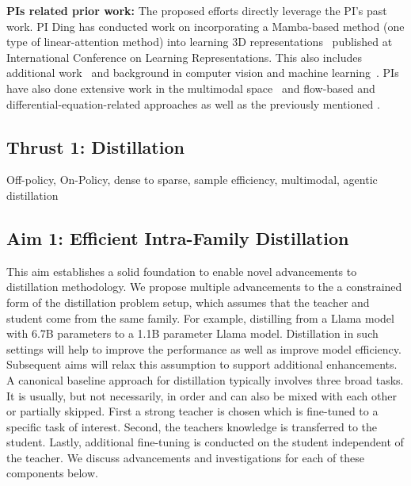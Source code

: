 \noindent\textbf{PIs related prior work: } The proposed efforts directly leverage the PI's past work. PI Ding has conducted work on incorporating a Mamba-based method (one type of linear-attention method) into learning 3D representations~\cite{ke2025mambev} published at International Conference on Learning Representations. This also includes additional work~\cite{ke2025tinybev} and background in computer vision and machine learning~\cite{nishi2021augmentation,dhakal2026gft}. PIs have also done extensive work in the multimodal space~\cite{ding2019multimodal, ding2022impact, jinadu2024noise, mim2025can} and flow-based and differential-equation-related approaches \cite{celledoni2025mixed, yang2025finding} as well as the previously mentioned \cite{chen2023provably, hagemann2025multilevel, deng2024reflected, park2024dynamical, yang2026}.

\subsection{Thrust 1: Distillation}
Off-policy, On-Policy, dense to sparse, sample efficiency, multimodal, agentic distillation


\subsection{Aim 1: Efficient Intra-Family Distillation} 
This aim establishes a solid foundation to enable novel advancements to distillation methodology. We propose multiple advancements to the a constrained form of the distillation problem setup, which assumes that the teacher and student come from the same family. For example, distilling from a Llama model with 6.7B parameters to a 1.1B parameter Llama model. Distillation in such settings will help to improve the performance as well as improve model efficiency. Subsequent aims will relax this assumption to support additional enhancements. A canonical baseline approach for distillation typically involves three broad tasks. It is usually, but not necessarily, in order and can also be mixed with each other or partially skipped. First a strong teacher is chosen which is fine-tuned to a specific task of interest. Second, the teachers knowledge is transferred to the student. Lastly, additional fine-tuning is conducted on the student independent of the teacher. We discuss advancements and investigations for each of these components below.

